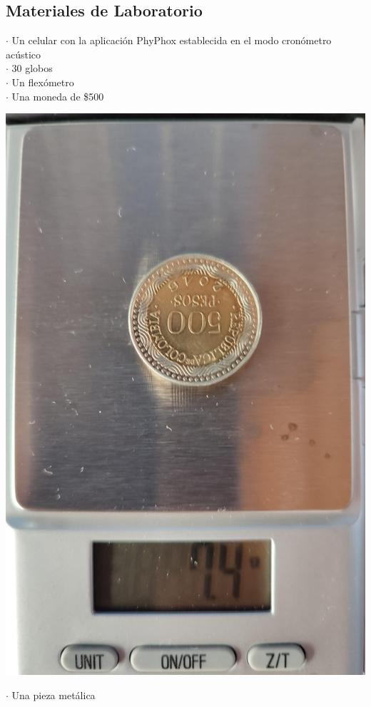 \begin{multicols}{2}
\section*{Materiales de Laboratorio}  
$\cdot$ Un celular con la aplicación PhyPhox establecida en el modo cronómetro acústico\\
$\cdot$ 30 globos\\
$\cdot$ Un flexómetro\\
$\cdot$ Una moneda de \$500\\
    \begin{center}
        \includegraphics[scale=0.05]{fig/moneda.png}\\
    \end{center}
$\cdot$ Una pieza metálica\\

\end{multicols}

